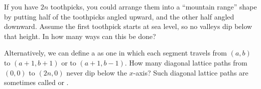 \documentclass{book}
\begin{document}
\setcounter{project}{194}
\addtocounter{project}{-1}
\begin{activity}[]\label{activity-187}
\hypertarget{p-1122}{}%
If you have \(2n\) toothpicks, you could arrange them into a ``mountain range'' shape by putting half of the toothpicks angled upward, and the other half angled downward.  Assume the first toothpick starts at sea level, so no valleys dip below that height. In how many ways can this be done?%
\par
\hypertarget{p-1123}{}%
Alternatively, we can define a  as one in which each segment travels from \((a,b)\) to \((a+1, b+1)\) or to \((a+1, b-1)\).  How many diagonal lattice paths from \((0,0)\) to \((2n,0)\) never dip below the \(x\)-axis?  Such diagonal lattice paths are sometimes called  or .%
\end{activity}
\end{document}
